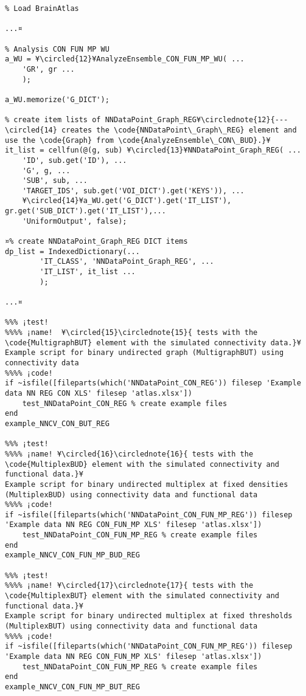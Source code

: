 \documentclass{tufte-handout}
\begin{document}
\begin{lstlisting}
% Load BrainAtlas

...¤

% Analysis CON FUN MP WU
a_WU = ¥\circled{12}¥AnalyzeEnsemble_CON_FUN_MP_WU( ...
    'GR', gr ...
    );

a_WU.memorize('G_DICT');

% create item lists of NNDataPoint_Graph_REG¥\circlednote{12}{---\circled{14} creates the \code{NNDataPoint\_Graph\_REG} element and use the \code{Graph} from \code{AnalyzeEnsemble\_CON\_BUD}.}¥
it_list = cellfun(@(g, sub) ¥\circled{13}¥NNDataPoint_Graph_REG( ...
    'ID', sub.get('ID'), ...
    'G', g, ...
    'SUB', sub, ...
    'TARGET_IDS', sub.get('VOI_DICT').get('KEYS')), ...
    ¥\circled{14}¥a_WU.get('G_DICT').get('IT_LIST'), gr.get('SUB_DICT').get('IT_LIST'),...
    'UniformOutput', false);

¤% create NNDataPoint_Graph_REG DICT items
dp_list = IndexedDictionary(...
        'IT_CLASS', 'NNDataPoint_Graph_REG', ...
        'IT_LIST', it_list ...
        );

...¤

%%% ¡test!
%%%% ¡name!  ¥\circled{15}\circlednote{15}{ tests with the \code{MultigraphBUT} element with the simulated connectivity data.}¥
Example script for binary undirected graph (MultigraphBUT) using connectivity data
%%%% ¡code!
if ~isfile([fileparts(which('NNDataPoint_CON_REG')) filesep 'Example data NN REG CON XLS' filesep 'atlas.xlsx'])
    test_NNDataPoint_CON_REG % create example files
end
example_NNCV_CON_BUT_REG

%%% ¡test!
%%%% ¡name! ¥\circled{16}\circlednote{16}{ tests with the \code{MultiplexBUD} element with the simulated connectivity and functional data.}¥
Example script for binary undirected multiplex at fixed densities (MultiplexBUD) using connectivity data and functional data
%%%% ¡code!
if ~isfile([fileparts(which('NNDataPoint_CON_FUN_MP_REG')) filesep 'Example data NN REG CON_FUN_MP XLS' filesep 'atlas.xlsx'])
    test_NNDataPoint_CON_FUN_MP_REG % create example files
end
example_NNCV_CON_FUN_MP_BUD_REG

%%% ¡test!
%%%% ¡name! ¥\circled{17}\circlednote{17}{ tests with the \code{MultiplexBUT} element with the simulated connectivity and functional data.}¥
Example script for binary undirected multiplex at fixed thresholds (MultiplexBUT) using connectivity data and functional data
%%%% ¡code!
if ~isfile([fileparts(which('NNDataPoint_CON_FUN_MP_REG')) filesep 'Example data NN REG CON_FUN_MP XLS' filesep 'atlas.xlsx'])
    test_NNDataPoint_CON_FUN_MP_REG % create example files
end
example_NNCV_CON_FUN_MP_BUT_REG

\end{lstlisting}
\end{document}
